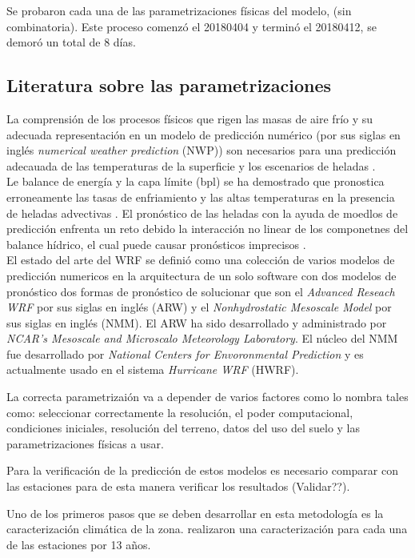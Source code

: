 Se probaron cada una de las parametrizaciones físicas del modelo, (sin combinatoria). Este proceso comenzó el 20180404 y terminó el 20180412, se demoró un total de 8 días.
\subsection{Literatura sobre las parametrizaciones}

La comprensión de los procesos físicos que rigen las masas de aire frío y su adecuada representación en un modelo de predicción numérico (por sus siglas en inglés \textit{numerical weather prediction} (NWP)) son necesarios para una predicción adecauada de las temperaturas de la superficie y los escenarios de heladas \citep{prabha2008}.\\



Le balance de energía y la capa límite (bpl) se ha demostrado que pronostica erroneamente las tasas de enfriamiento y las altas temperaturas en la presencia de heladas advectivas \citep{heinemann1988}. El pronóstico de las heladas con la ayuda de moedlos de predicción enfrenta un reto debido la interacción no linear de los componetnes del balance hídrico, el cual puede causar pronósticos imprecisos \citep{gutowski2003}.\\

El estado del arte del WRF se definió como una colección de varios modelos de predicción numericos en la arquitectura de un solo software con dos modelos de pronóstico dos formas de pronóstico de solucionar que son el \textit{Advanced Reseach WRF} por sus siglas en inglés (ARW) y el \textit{Nonhydrostatic Mesoscale Model} por sus siglas en inglés (NMM). El ARW ha sido desarrollado y administrado por \textit{NCAR's Mesoscale and Microscalo Meteorology Laboratory}. El núcleo del NMM fue desarrollado por \textit{National Centers for Envoronmental Prediction} y es actualmente usado en el sistema \textit{Hurricane WRF} (HWRF).

La correcta parametrizaión va a depender de varios factores como lo nombra \citet{prabha2008evaluation} tales como: seleccionar correctamente la resolución, el poder computacional, condiciones iniciales, resolución del terreno, datos del uso del suelo y las parametrizaciones físicas a usar.

Para la verificación de la predicción de estos modelos es necesario comparar con las estaciones para de esta manera verificar los resultados (Validar??).

Uno de los primeros pasos que se deben desarrollar en esta metodología es la caracterización climática de la zona. \citet{prabha2008evaluation} realizaron una caracterización para cada una de las estaciones por 13 años.

